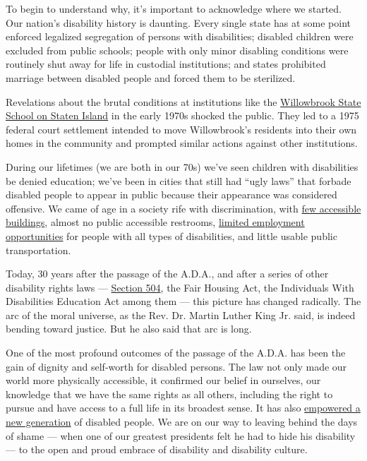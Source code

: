 To begin to understand why, it's important to acknowledge where we
started. Our nation's disability history is daunting. Every single state
has at some point enforced legalized segregation of persons with
disabilities; disabled children were excluded from public schools;
people with only minor disabling conditions were routinely shut away for
life in custodial institutions; and states prohibited marriage between
disabled people and forced them to be sterilized.

Revelations about the brutal conditions at institutions like the
\href{https://www.nytimes3xbfgragh.onion/2020/02/21/nyregion/willowbrook-state-school-staten-island.html}{Willowbrook
State School on Staten Island} in the early 1970s shocked the public.
They led to a 1975 federal court settlement intended to move
Willowbrook's residents into their own homes in the community and
prompted similar actions against other institutions.

During our lifetimes (we are both in our 70s) we've seen children with
disabilities be denied education; we've been in cities that still had
``ugly laws'' that forbade disabled people to appear in public because
their appearance was considered offensive. We came of age in a society
rife with discrimination, with
\href{https://www.nytimes3xbfgragh.onion/2020/07/20/arts/disabilities-architecture-design.html}{few
accessible buildings}, almost no public accessible restrooms,
\href{https://www.nytimes3xbfgragh.onion/2020/07/23/business/disability-discrimination-jobs-sheltered-workshop.html}{limited
employment opportunities} for people with all types of disabilities, and
little usable public transportation.

Today, 30 years after the passage of the A.D.A., and after a series of
other disability rights laws ---
\href{https://www.nytimes3xbfgragh.onion/2020/07/22/us/504-sit-in-disability-rights.html}{Section
504}, the Fair Housing Act, the Individuals With Disabilities Education
Act among them --- this picture has changed radically. The arc of the
moral universe, as the Rev. Dr. Martin Luther King Jr. said, is indeed
bending toward justice. But he also said that arc is long.

One of the most profound outcomes of the passage of the A.D.A. has been
the gain of dignity and self-worth for disabled persons. The law not
only made our world more physically accessible, it confirmed our belief
in ourselves, our knowledge that we have the same rights as all others,
including the right to pursue and have access to a full life in its
broadest sense. It has also
\href{https://www.nytimes3xbfgragh.onion/2020/07/17/style/americans-with-disabilities-act.html}{empowered
a new generation} of disabled people. We are on our way to leaving
behind the days of shame --- when one of our greatest presidents felt he
had to hide his disability --- to the open and proud embrace of
disability and disability culture.

